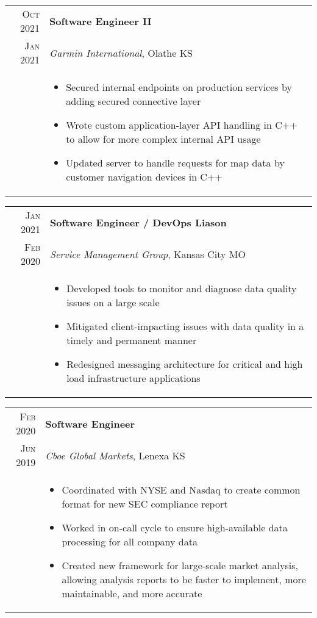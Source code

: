 \documentclass[a4paper,10pt]{article}
\begin{document}
\begin{tabular}{r|p{15cm}}
  \textsc{Oct 2021}  & \textbf{Software Engineer II} \\
  \textsc{Jan 2021}  & \textit{Garmin International}, Olathe KS
  \\ &
       \begin{itemize}
       \item Secured internal endpoints on production services by adding secured connective layer
       \item Wrote custom application-layer API handling in C++ to allow for more complex internal API usage
       \item Updated server to handle requests for map data by customer navigation devices in C++
       \end{itemize} \\
\end{tabular}

\begin{tabular}{r|p{15cm}}
  \textsc{Jan 2021}  & \textbf{Software Engineer / DevOps Liason} \\
  \textsc{Feb 2020}  & \textit{Service Management Group}, Kansas City MO
  \\ &
       \begin{itemize}
       \item Developed tools to monitor and diagnose data quality issues on a large scale
       \item Mitigated client-impacting issues with data quality in a timely and permanent manner
       \item Redesigned messaging architecture for critical and high load infrastructure applications
       \end{itemize} \\
\end{tabular}

\begin{tabular}{r|p{15cm}}
  \textsc{Feb 2020}  & \textbf{Software Engineer} \\
  \textsc{Jun 2019}  & \textit{Cboe Global Markets}, Lenexa KS
  \\ &
       \begin{itemize}
       \item Coordinated with NYSE and Nasdaq to create common format for new SEC compliance report
       \item  Worked in on-call cycle to ensure high-available data processing for all company data
       \item Created new framework for large-scale market analysis,
             allowing analysis reports to be faster to implement, more maintainable, and more accurate
       \end{itemize} \\
\end{tabular}
\end{document}
